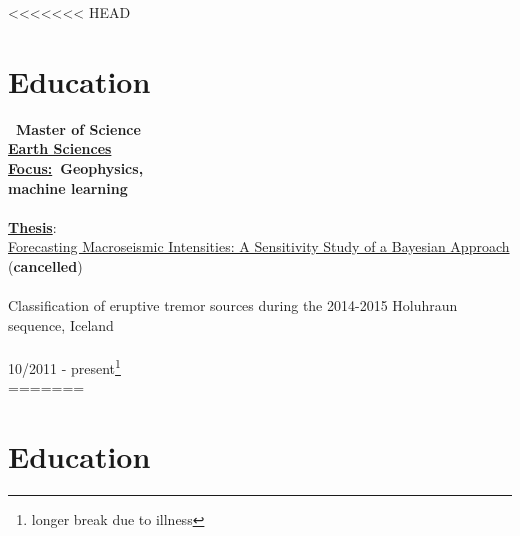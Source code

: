 \documentclass{article}
\begin{document}
\hfill
\vrule
\hfill
<<<<<<< HEAD
\begin{minipage}[t]{0.69\textwidth}
	\section*{\fontsize{18pt}{24pt}\selectfont \color{pblue} Education}
	\begin{minipage}{0.34\textwidth}
	\textbf{\color{pblue}\faHourglassHalf~Master of Science} \\
	\textbf{\underline{Earth Sciences}}\\
	\textbf{\underline{Focus:}~Geophysics, \\machine learning}\\\\
	\textbf{\underline{Thesis}}:\\
	\href{https://github.com/silvioschwarz/master-thesis}{Forecasting Macroseismic Intensities: A Sensitivity Study of a Bayesian Approach} (\textbf{cancelled})\\\\
	Classification of eruptive tremor sources during the 2014-2015 Holuhraun sequence, Iceland\\\\
		10/2011 - present\footnote{longer break due to illness}\\
=======
\begin{minipage}[t]{0.7\textwidth}
		\section*{\fontsize{18pt}{24pt}\selectfont \color{pblue} Education}
		

\end{minipage}
\end{minipage}
\end{minipage}
\end{document}
